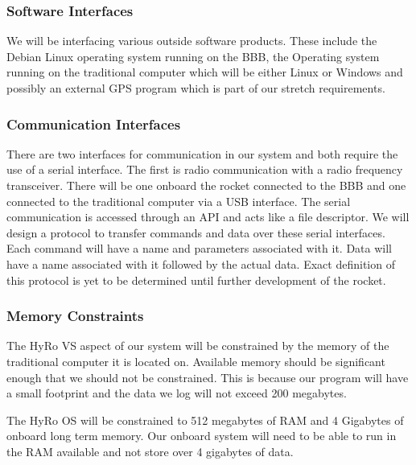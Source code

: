 \documentclass[10pt,draftclsnofoot,onecolumn,compsoc]{IEEEtran}
\begin{document}
\subsubsection{Software Interfaces}
	We will be interfacing various outside software products. These include the Debian Linux operating system running on the BBB, the Operating system running on the traditional computer which will be either Linux or Windows and possibly an external GPS program which is part of our stretch requirements.

\subsubsection{Communication Interfaces}
There are two interfaces for communication in our system and both require the use of a serial interface. The first is radio communication with a radio frequency transceiver. There will be one onboard the rocket connected to the BBB and one connected to the traditional computer via a USB interface. The serial communication is accessed through an API and acts like a file descriptor. We will design a protocol to transfer commands and data over these serial interfaces. Each command will have a name and parameters associated with it. Data will have a name associated with it followed by the actual data. Exact definition of this protocol is yet to be determined until further development of the rocket.
\subsubsection{Memory Constraints}
The HyRo VS aspect of our system will be constrained by the memory of the traditional computer it is located on. Available memory should be significant enough that we should not be constrained. This is because our program will have a small footprint and the data we log will not exceed 200 megabytes.\par 
	The HyRo OS will be constrained to 512 megabytes of RAM and 4 Gigabytes of onboard long term memory. Our onboard system will need to be able to run in the RAM available and not store over 4 gigabytes of data.
\end{document}
